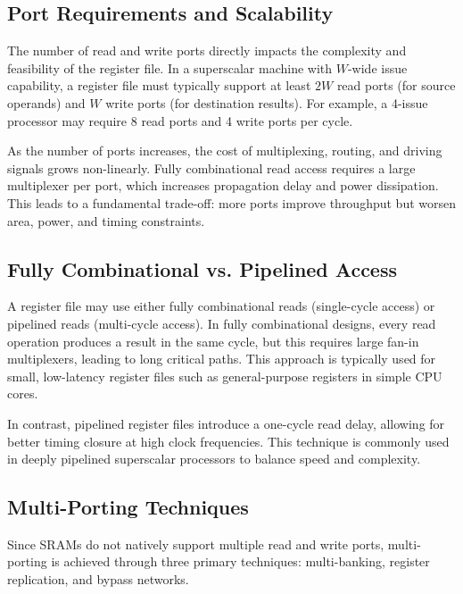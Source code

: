 \subsection{Port Requirements and Scalability}
The number of read and write ports directly impacts the complexity and feasibility of the register file. In a superscalar machine with \( W \)-wide issue capability, a register file must typically support at least \( 2W \) read ports (for source operands) and \( W \) write ports (for destination results). For example, a 4-issue processor may require 8 read ports and 4 write ports per cycle.

As the number of ports increases, the cost of multiplexing, routing, and driving signals grows non-linearly. Fully combinational read access requires a large multiplexer per port, which increases propagation delay and power dissipation. This leads to a fundamental trade-off: more ports improve throughput but worsen area, power, and timing constraints.

\subsection{Fully Combinational vs. Pipelined Access}
A register file may use either fully combinational reads (single-cycle access) or pipelined reads (multi-cycle access). In fully combinational designs, every read operation produces a result in the same cycle, but this requires large fan-in multiplexers, leading to long critical paths. This approach is typically used for small, low-latency register files such as general-purpose registers in simple CPU cores.

In contrast, pipelined register files introduce a one-cycle read delay, allowing for better timing closure at high clock frequencies. This technique is commonly used in deeply pipelined superscalar processors to balance speed and complexity.

\subsection{Multi-Porting Techniques}
Since SRAMs do not natively support multiple read and write ports, multi-porting is achieved through three primary techniques: multi-banking, register replication, and bypass networks.

